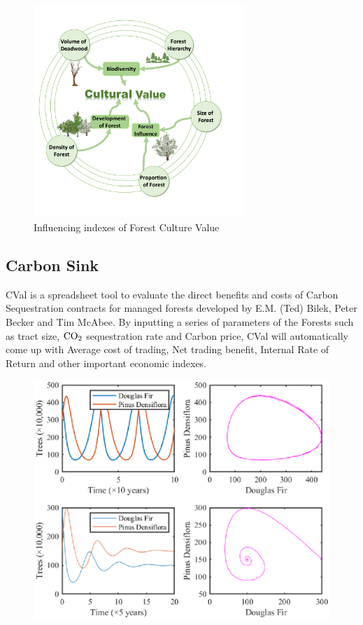 \documentclass{mcmthesis}
\numberwithin{figure}{section}
\numberwithin{table}{section}
\numberwithin{equation}{section}
\begin{document}
\begin{figure}[htbp]
  \centering
  \includegraphics[width = 8cm]{code&pic/Model2.pdf}
  \caption{Influencing indexes of Forest Culture Value}\label{Index_CulVal}
\end{figure}

\subsection{Carbon Sink}

CVal is a spreadsheet tool to evaluate the direct benefits and costs of Carbon 
Sequestration contracts for managed forests developed by E.M. (Ted) Bilek,
Peter Becker and Tim McAbee. By inputting a series of parameters of the Forests
such as tract size, $ \rm{CO_2} $ sequestration rate and Carbon price, CVal will
automatically come up with Average cost of trading, Net trading benefit, 
Internal Rate of Return and other important economic indexes. 




\begin{figure}[htbp]
  \centering
  \includegraphics[width = 12cm]{code&pic/Interspecies.eps}
\end{figure}
\end{document}
